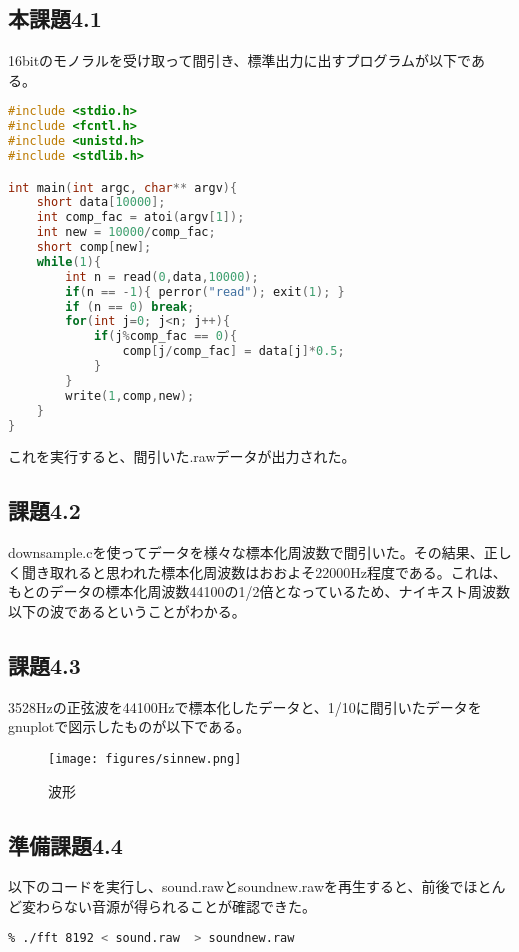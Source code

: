 \documentclass{ltjsarticle}
\begin{document}
\subsection{本課題4.1}
16bitのモノラルを受け取って間引き、標準出力に出すプログラムが以下である。
\begin{lstlisting}[caption=downsample.c,language=C]
#include <stdio.h>
#include <fcntl.h>
#include <unistd.h>
#include <stdlib.h>

int main(int argc, char** argv){
    short data[10000];
    int comp_fac = atoi(argv[1]);
    int new = 10000/comp_fac;
    short comp[new];
    while(1){
        int n = read(0,data,10000);
        if(n == -1){ perror("read"); exit(1); }
        if (n == 0) break;
        for(int j=0; j<n; j++){
            if(j%comp_fac == 0){
                comp[j/comp_fac] = data[j]*0.5;
            }
        }
        write(1,comp,new);
    }
}
\end{lstlisting}
これを実行すると、間引いた.rawデータが出力された。

\subsection{課題4.2}
downsample.cを使ってデータを様々な標本化周波数で間引いた。その結果、正しく聞き取れると思われた標本化周波数はおおよそ22000Hz程度である。これは、もとのデータの標本化周波数44100の1/2倍となっているため、ナイキスト周波数以下の波であるということがわかる。

\subsection{課題4.3}
3528Hzの正弦波を44100Hzで標本化したデータと、1/10に間引いたデータをgnuplotで図示したものが以下である。
\begin{figure}[H]
  \begin{center}
    \texttt{[image: figures/sinnew.png]}
    \caption{波形}
  \end{center}
\end{figure}

\subsection{準備課題4.4}
以下のコードを実行し、sound.rawとsoundnew.rawを再生すると、前後でほとんど変わらない音源が得られることが確認できた。
\begin{lstlisting}[caption=FFT,language=bash]
% gcc fft.c -o fft
% ./fft 8192 < sound.raw  > soundnew.raw
\end{lstlisting}
\end{document}
